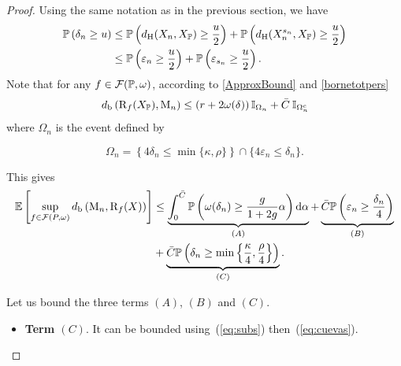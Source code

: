 \begin{proof}
Using the same notation as in the previous section, we have
\begin{align}
\mathbb{P}\left(\delta_n \geq u\right)& 
\leq\mathbb{P}\left(d_{\rm H}(X_n,X_{\mathbb{P}})\geq\frac{u}{2}\right)+\mathbb{P}\left(d_{\rm H}(X^{s_n}_{n},X_{\mathbb{P}})\geq\frac{u}{2}\right) \nonumber \\
& \leq\mathbb{P}\left(\varepsilon_n\geq\frac{u}{2}\right)+\mathbb{P}\left(\varepsilon_{s_n}\geq\frac{u}{2}\right). \label{eq:subs}
\end{align}
Note that for any  $f \in \mathcal F(\mathbb{P},\omega)$, according to \eqref{ApproxBound} and \eqref{bornetotpers}
\begin{equation} 
\label{DecompOmegan}
d_{\rm b}\left(\mathrm{R}_f(X_{\mathbb{P}}),\mathrm{M}_n\right)   \leq      \left(r + 2 \omega(\delta) \right) {\mathbb I}_{\Omega_n} + \bar C  \: {\mathbb I}_{\Omega_n^c}
\end{equation}
where $\Omega_n$ is the event defined by

$$\Omega_n = 
 \left\{  4 \delta_n \leq\min\{\kappa,\rho\}\right\}
  \cap \{ 4\varepsilon_{n}  \leq \delta_n \} .$$

This gives
\begin{align*}
\mathbb{E} \left[ \sup_{f \in \mathcal F(P,\omega)} d_{\rm b}\left(\mathrm{M}_n,\mathrm{R}_f(X)\right)\right]&\leq
\underbrace{\int_0^{\bar C}\mathbb{P}\left(\omega(\delta_n)\geq\frac{g}{1+2g}\alpha\right){\rm d}\alpha}_{(A)}
+\underbrace{\bar C\mathbb{P}\left(\varepsilon_n\geq\frac{\delta_n}{4}\right)}_{(B)}\\
&+
\underbrace{\bar C\mathbb{P}\left(\delta_n\geq\min\left\{\frac{\kappa}{4},\frac{\rho}{4}\right\}\right)}_{(C)}.
\end{align*}

Let us bound the three terms $(A)$, $(B)$ and $(C)$. %
\begin{itemize}

\item {\bf Term $(C)$}.
It can be bounded using~(\ref{eq:subs}) then~(\ref{eq:cuevas}).


\end{itemize}
\end{proof}
